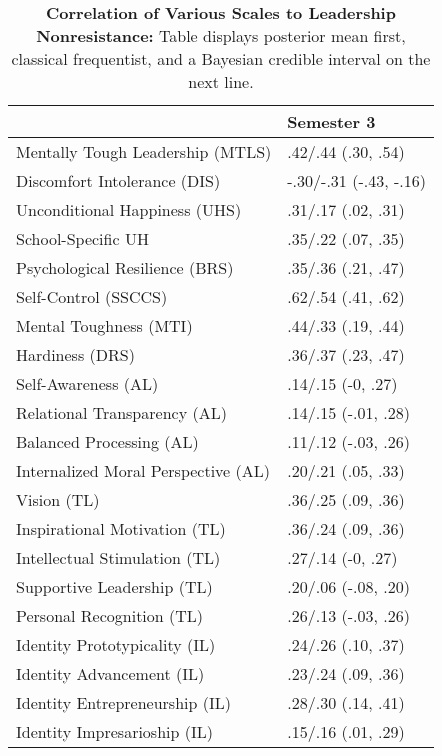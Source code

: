 \begin{table}[ht]
\centering
\begin{tabular}{ll}
  \hline
 & Semester 3 \\ 
  \hline
Mentally Tough Leadership (MTLS) & .42/.44 (.30, .54) \\ 
  Discomfort Intolerance (DIS) & -.30/-.31 (-.43, -.16) \\ 
  Unconditional Happiness (UHS) & .31/.17 (.02, .31) \\ 
  School-Specific UH & .35/.22 (.07, .35) \\ 
  Psychological Resilience (BRS) & .35/.36 (.21, .47) \\ 
  Self-Control (SSCCS) & .62/.54 (.41, .62) \\ 
  Mental Toughness (MTI) & .44/.33 (.19, .44) \\ 
  Hardiness (DRS) & .36/.37 (.23, .47) \\ 
  Self-Awareness (AL) & .14/.15 (-0, .27) \\ 
  Relational Transparency (AL) & .14/.15 (-.01, .28) \\ 
  Balanced Processing (AL) & .11/.12 (-.03, .26) \\ 
  Internalized Moral Perspective (AL) & .20/.21 (.05, .33) \\ 
  Vision (TL) & .36/.25 (.09, .36) \\ 
  Inspirational Motivation (TL) & .36/.24 (.09, .36) \\ 
  Intellectual Stimulation (TL) & .27/.14 (-0, .27) \\ 
  Supportive Leadership (TL) & .20/.06 (-.08, .20) \\ 
  Personal Recognition (TL) & .26/.13 (-.03, .26) \\ 
  Identity Prototypicality (IL) & .24/.26 (.10, .37) \\ 
  Identity Advancement (IL) & .23/.24 (.09, .36) \\ 
  Identity Entrepreneurship (IL) & .28/.30 (.14, .41) \\ 
  Identity Impresarioship (IL) & .15/.16 (.01, .29) \\ 
   \hline
\end{tabular}
\caption{\textbf{Correlation of Various Scales to Leadership Nonresistance:} Table displays posterior mean first, classical frequentist, and a Bayesian credible interval on the next line.} 
\label{tab:lnr_corr}
\end{table}
